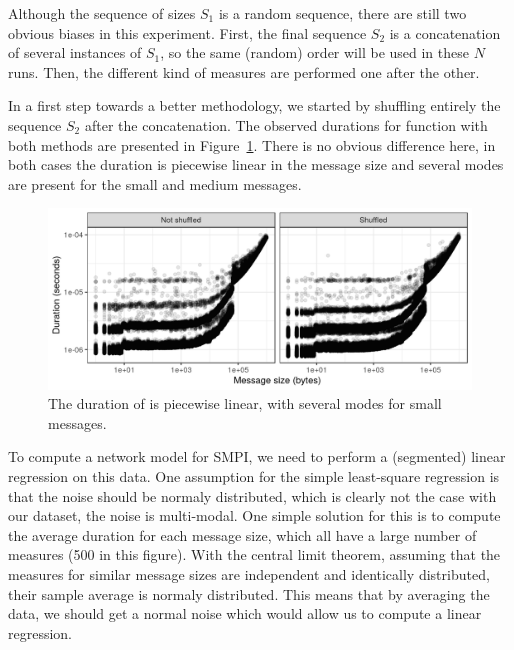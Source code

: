         Although the sequence of sizes \(S_1\) is a random sequence, there are still two obvious biases in this
        experiment.  First, the final sequence \(S_2\) is a concatenation of several instances of \(S_1\), so the same
        (random) order will be used in these \(N\) runs. Then, the different kind of measures are performed one after
        the other.

        In a first step towards a better methodology, we started by shuffling entirely the sequence \(S_2\) after the
        concatenation. The observed durations for function \recv with both methods are presented in
        Figure~\ref{fig:randomizing_order:raw_data}. There is no obvious difference here, in both cases the duration is
        piecewise linear in the message size and several modes are present for the small and medium messages.

        \begin{figure}[htpb]
            \centering
            \includegraphics[width=\linewidth]{img/experiment/randomizing_order/raw_data.png}
            \caption{The duration of \recv is piecewise linear, with several modes for small messages.}%
            \label{fig:randomizing_order:raw_data}
        \end{figure}

        To compute a network model for SMPI, we need to perform a (segmented) linear regression on this data. One
        assumption for the simple least-square regression is that the noise should be normaly distributed, which is
        clearly not the case with our dataset, the noise is multi-modal. One simple solution for this is to compute the
        average duration for each message size, which all have a large number of measures (500 in this figure). With the
        central limit theorem, assuming that the measures for similar message sizes are independent and identically
        distributed, their sample average is normaly distributed. This means that by averaging the data, we should get a
        normal noise which would allow us to compute a linear regression.

